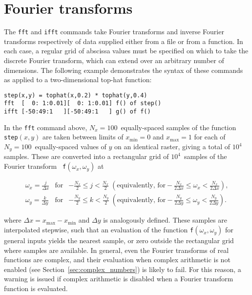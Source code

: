\section{Fourier transforms}

The {\tt fft} and {\tt ifft} commands take Fourier
transforms and inverse Fourier transforms respectively of data supplied either
from a file or from a function. In each case, a regular grid of abscissa values
must be specified on which to take the discrete Fourier transform, which can
extend over an arbitrary number of dimensions. The following example
demonstrates the syntax of these commands as applied to a two-dimensional
top-hat function:

\begin{verbatim}
step(x,y) = tophat(x,0.2) * tophat(y,0.4)
fft  [  0: 1:0.01][  0: 1:0.01] f() of step()
ifft [-50:49:1   ][-50:49:1   ] g() of f()
\end{verbatim}

\noindent In the {\tt fft} command above, $N_x=100$~equally-spaced samples of
the function {\tt step}$(x,y)$ are taken between limits of $x_\mathrm{min}=0$
and $x_\mathrm{max}=1$ for each of $N_y=100$~equally-spaced values of $y$ on an
identical raster, giving a total of $10^4$ samples. These are converted into a
rectangular grid of $10^4$~samples of the Fourier transform {\tt
f}$(\omega_x,\omega_y)$ at

\begin{eqnarray}
\omega_x = \frac{j}{\Delta x} & \textrm{for} & -\frac{N_x}{2}\leq j <\frac{N_x}{2} \; \left(\textrm{equivalently, for} -\frac{N_x}{2\Delta x}\leq \omega_x <\frac{N_x}{2\Delta x} \right), \nonumber \\
\omega_y = \frac{k}{\Delta y} & \textrm{for} & -\frac{N_y}{2}\leq k <\frac{N_y}{2} \; \left(\textrm{equivalently, for} -\frac{N_y}{2\Delta y}\leq \omega_y <\frac{N_y}{2\Delta y} \right). \nonumber
\end{eqnarray}

\noindent where $\Delta x=x_\mathrm{max}-x_\mathrm{min}$ and $\Delta y$ is
analogously defined. These samples are interpolated stepwise, such that an
evaluation of the function {\tt f}$(\omega_x,\omega_y)$ for general inputs
yields the nearest sample, or zero outside the rectangular grid where samples
are available. In general, even the Fourier transforms of real functions are
complex, and their evaluation when complex arithmetic is not enabled (see
Section~\ref{sec:complex_numbers}) is likely to fail. For this reason, a
warning is issued if complex arithmetic is disabled when a Fourier transform
function is evaluated.

